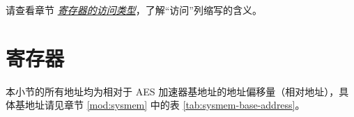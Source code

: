 \documentclass[main\_\_CN.tex]{subfiles}
\begin{document}
请查看章节 \hyperref[glossary-access-types]{\textit{寄存器的访问类型}}，了解“访问”列缩写的含义。




\clearpage
\section{寄存器}

本小节的所有地址均为相对于 AES 加速器基地址的地址偏移量（相对地址），具体基地址请见章节 \ref{mod:sysmem} \textit{} 中的表 \ref{tab:sysmem-base-address}。


\end{document}
